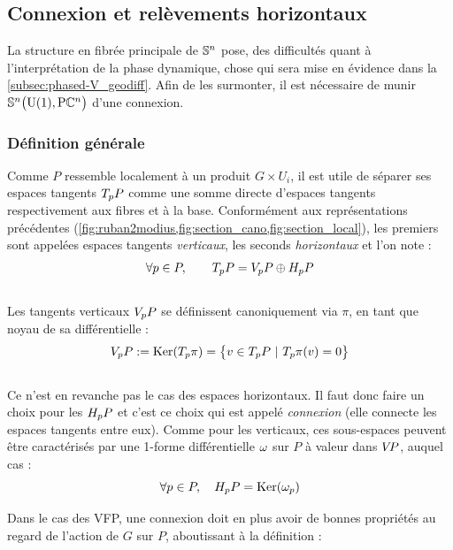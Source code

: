 \subsection{Connexion et relèvements horizontaux}
\label{subsec:connexion2VFP}

La structure en fibrée principale de $\S{n}$ pose, des difficultés quant à l'interprétation de la phase dynamique, chose qui sera mise en évidence dans la \cref{subsec:phased-V_geodiff}. Afin de les surmonter, il est nécessaire de munir $\VFP$ d'une connexion.

\subsubsection{Définition générale}
\label{subsec:def2conn}

Comme $P$ ressemble localement à un produit $G\times U_i$, il est utile de séparer ses espaces tangents $\tg[p]{P}$ comme une somme directe d'espaces tangents respectivement aux fibres et à la base. Conformément aux représentations précédentes (\cref{fig:ruban2modius,fig:section_cano,fig:section_local}), les premiers sont appelées espaces tangents \emph{verticaux}, les seconds \emph{horizontaux} et l'on note :
\[\forall p\in P,\qquad \tg[p]{P} = \vg[p]{P} \oplus \hg[p]{P}\]
\\
Les tangents verticaux $\vg[p]{P}$ se définissent canoniquement via $\pi$, en tant que noyau de sa différentielle :
\[\vg[p]{P} \defeq \Ker (\tg[p]{\pi}) = \big\{ v\in\tg[p]{P}\ |\ \tg[p]{\pi}(v)=0 \big\}\]
\\ 
Ce n'est en revanche pas le cas des espaces horizontaux. Il faut donc faire un choix pour les $\hg[p]{P}$ et c'est ce choix qui est appelé \emph{connexion} (elle connecte les espaces tangents entre eux).
Comme pour les verticaux, ces sous-espaces peuvent être caractérisés par une 1-forme différentielle $\conn$ sur $P$ à valeur dans $\vg{P}$, auquel cas :
\[\forall p\in P,\quad \hg[p]{P} = \Ker(\conn_p)\]
\skipl

Dans le cas des VFP, une connexion doit en plus avoir de bonnes propriétés au regard de l'action de $G$ sur $P$, aboutissant à la définition :

